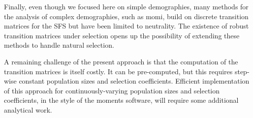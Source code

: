 \documentclass[review,nonatbib]{elsarticle}
\newcommand{\afs}[2]{\Phi_{#1}^{(#2)}}
\begin{document}
Finally, even though we focused here on simple demographies, many methods for the analysis of complex demographies, 
such as momi, build on discrete transition matrices for the SFS but have been limited to neutrality.
 The existence of robust transition matrices 
under selection opens up the possibility of extending these methods to handle natural selection.

A remaining challenge of the present approach is that the computation of the transition matrices is itself costly. 
It can be pre-computed, but this requires step-wise constant population sizes 
and selection coefficients. Efficient implementation of this approach for continuously-varying population
sizes and selection coefficients, in the style of the moments software, will require some additional analytical work.






\end{document}

